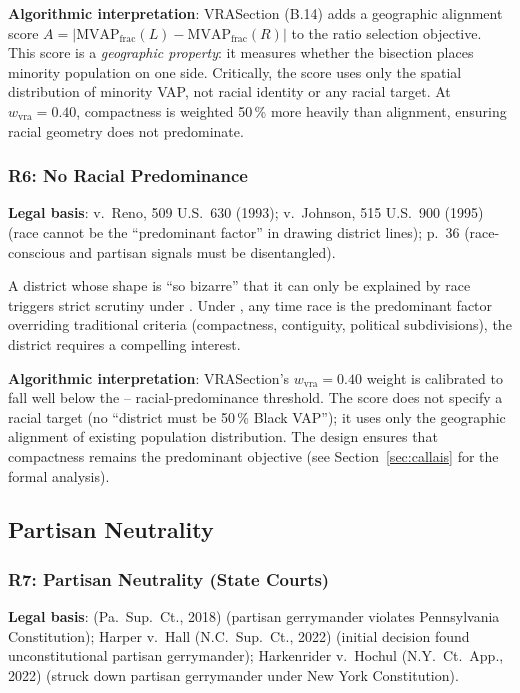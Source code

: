 \textbf{Algorithmic interpretation}: VRASection (B.14) adds a geographic alignment
score $A = |\text{MVAP}_\text{frac}(L) - \text{MVAP}_\text{frac}(R)|$ to the
ratio selection objective.
This score is a \emph{geographic property}: it measures whether the bisection
places minority population on one side.
Critically, the score uses only the spatial distribution of minority VAP,
not racial identity or any racial target.
At $w_\text{vra} = 0.40$, compactness is weighted 50\,\% more heavily than
alignment, ensuring racial geometry does not predominate.

\subsubsection*{R6: No Racial Predominance}

\textbf{Legal basis}: \shaw{} v.\ Reno, 509 U.S.\ 630 (1993); \miller{} v.\
Johnson, 515 U.S.\ 900 (1995) (race cannot be the ``predominant factor'' in
drawing district lines); \callais{} p.~36 (race-conscious and partisan signals
must be disentangled).

A district whose shape is ``so bizarre'' that it can only be explained by race
triggers strict scrutiny under \shaw{}.
Under \miller{}, any time race is the predominant factor overriding traditional
criteria (compactness, contiguity, political subdivisions), the district
requires a compelling interest.

\textbf{Algorithmic interpretation}: VRASection's $w_\text{vra} = 0.40$ weight
is calibrated to fall well below the \shaw{}--\miller{} racial-predominance
threshold.
The score does not specify a racial target (no ``district must be 50\,\% Black VAP'');
it uses only the geographic alignment of existing population distribution.
The design ensures that compactness remains the predominant objective
(see Section~\ref{sec:callais} for the formal analysis).

\subsection{Partisan Neutrality}

\subsubsection*{R7: Partisan Neutrality (State Courts)}

\textbf{Legal basis}: \lwvpa{} (Pa.\ Sup.\ Ct., 2018) (partisan gerrymander
violates Pennsylvania Constitution); Harper v.\ Hall (N.C.\ Sup.\ Ct., 2022)
(initial decision found unconstitutional partisan gerrymander); Harkenrider v.\
Hochul (N.Y.\ Ct.\ App., 2022) (struck down partisan gerrymander under
New York Constitution).

